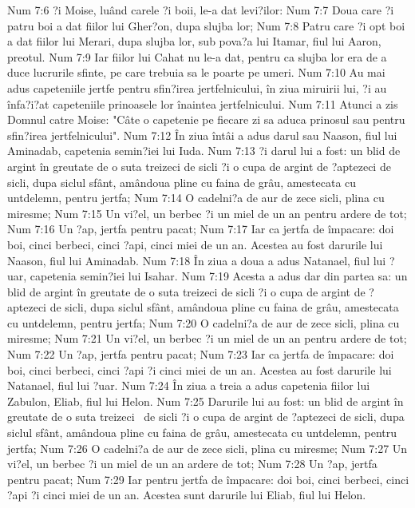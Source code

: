 Num 7:6  ?i Moise, luând carele ?i boii, le-a dat levi?ilor:
Num 7:7  Doua care ?i patru boi a dat fiilor lui Gher?on, dupa slujba lor;
Num 7:8  Patru care ?i opt boi a dat fiilor lui Merari, dupa slujba lor, sub pova?a lui Itamar, fiul lui Aaron, preotul.
Num 7:9  Iar fiilor lui Cahat nu le-a dat, pentru ca slujba lor era de a duce lucrurile sfinte, pe care trebuia sa le poarte pe umeri.
Num 7:10  Au mai adus capeteniile jertfe pentru sfin?irea jertfelnicului, în ziua miruirii lui, ?i au înfa?i?at capeteniile prinoasele lor înaintea jertfelnicului.
Num 7:11  Atunci a zis Domnul catre Moise: "Câte o capetenie pe fiecare zi sa aduca prinosul sau pentru sfin?irea jertfelnicului".
Num 7:12  În ziua întâi a adus darul sau Naason, fiul lui Aminadab, capetenia semin?iei lui Iuda.
Num 7:13  ?i darul lui a fost: un blid de argint în greutate de o suta treizeci de sicli ?i o cupa de argint de ?aptezeci de sicli, dupa siclul sfânt, amândoua pline cu faina de grâu, amestecata cu untdelemn, pentru jertfa;
Num 7:14  O cadelni?a de aur de zece sicli, plina cu miresme;
Num 7:15  Un vi?el, un berbec ?i un miel de un an pentru ardere de tot;
Num 7:16  Un ?ap, jertfa pentru pacat;
Num 7:17  Iar ca jertfa de împacare: doi boi, cinci berbeci, cinci ?api, cinci miei de un an. Acestea au fost darurile lui Naason, fiul lui Aminadab.
Num 7:18  În ziua a doua a adus Natanael, fiul lui ?uar, capetenia semin?iei lui Isahar.
Num 7:19  Acesta a adus dar din partea sa: un blid de argint în greutate de o suta treizeci de sicli ?i o cupa de argint de ?aptezeci de sicli, dupa siclul sfânt, amândoua pline cu faina de grâu, amestecata cu untdelemn, pentru jertfa;
Num 7:20  O cadelni?a de aur de zece sicli, plina cu miresme;
Num 7:21  Un vi?el, un berbec ?i un miel de un an pentru ardere de tot;
Num 7:22  Un ?ap, jertfa pentru pacat;
Num 7:23  Iar ca jertfa de împacare: doi boi, cinci berbeci, cinci ?api ?i cinci miei de un an. Acestea au fost darurile lui Natanael, fiul lui ?uar.
Num 7:24  În ziua a treia a adus capetenia fiilor lui Zabulon, Eliab, fiul lui Helon.
Num 7:25  Darurile lui au fost: un blid de argint în greutate de o suta treizeci  de sicli ?i o cupa de argint de ?aptezeci de sicli, dupa siclul sfânt, amândoua pline cu faina de grâu, amestecata cu untdelemn, pentru jertfa;
Num 7:26  O cadelni?a de aur de zece sicli, plina cu miresme;
Num 7:27  Un vi?el, un berbec ?i un miel de un an ardere de tot;
Num 7:28  Un ?ap, jertfa pentru pacat;
Num 7:29  Iar pentru jertfa de împacare: doi boi, cinci berbeci, cinci ?api ?i cinci miei de un an. Acestea sunt darurile lui Eliab, fiul lui Helon.

